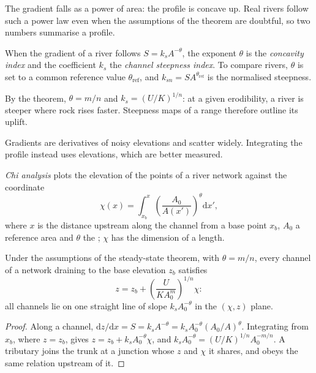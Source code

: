 The gradient falls as a power of area: the profile is concave up. Real
rivers follow such a power law even when the assumptions of the theorem are
doubtful, so two numbers summarise a profile.

\begin{definition}\label{def:b3:quantitative-geomorphology:indices}
When the gradient of a river follows $S = k_s A^{-\theta}$, the exponent
$\theta$ is the \emph{concavity index} and the
coefficient $k_s$ the \emph{channel steepness index}.
To compare rivers, $\theta$ is set to a common reference value
$\theta_{\mathrm{ref}}$, and $k_{sn} = S A^{\theta_{\mathrm{ref}}}$ is the
normalised steepness.
\end{definition}

By the theorem, $\theta = m/n$ and $k_s = (U/K)^{1/n}$: at a given
erodibility, a river is steeper where rock rises faster. Steepness maps of
a range therefore outline its uplift.


Gradients are derivatives of noisy elevations and scatter widely. Integrating
the profile instead uses elevations, which are better measured.

\begin{definition}\label{def:b3:quantitative-geomorphology:chi}
\emph{Chi analysis} plots the elevation of the points
of a river network against the coordinate
\[
\chi(x) = \int_{x_b}^{x} \left(\frac{A_0}{A(x')}\right)^{\theta}
\mathrm{d}x' ,
\]
where $x$ is the distance upstream along the channel from a base point
$x_b$, $A_0$ a reference area and $\theta$ the ; $\chi$ has
the dimension of a length.
\end{definition}

\begin{proposition}\label{prop:b3:quantitative-geomorphology:chi}
Under the assumptions of the steady-state theorem, with $\theta = m/n$,
every channel of a network draining to the base elevation $z_b$ satisfies
\[
z = z_b + \left(\frac{U}{K A_0^{m}}\right)^{1/n} \chi :
\]
all channels lie on one straight line of slope $k_s A_0^{-\theta}$ in the
$(\chi, z)$ plane.
\end{proposition}

\begin{proof}
Along a channel, $\mathrm{d}z/\mathrm{d}x = S = k_s A^{-\theta} = k_s
A_0^{-\theta}(A_0/A)^{\theta}$. Integrating from $x_b$, where $z = z_b$,
gives $z = z_b + k_s A_0^{-\theta}\chi$, and $k_s A_0^{-\theta} =
(U/K)^{1/n} A_0^{-m/n}$. A tributary joins the trunk at a junction whose
$z$ and $\chi$ it shares, and obeys the same relation upstream of it.
\end{proof}

